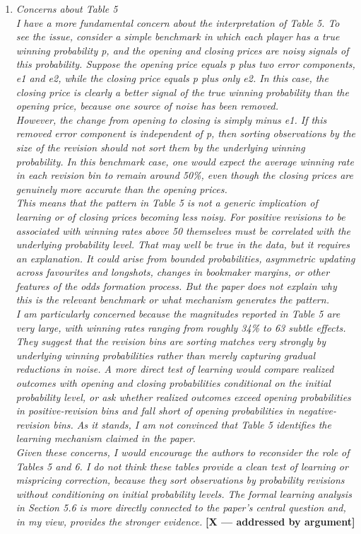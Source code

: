 \documentclass[letterpaper,12pt]{article}
\newcounter{b}
\newcommand{\argX}{\textcolor{green!55!black}{\textbf{[X --- addressed by argument]}}}
\begin{document}
\begin{enumerate}
\item \textit{Concerns about Table 5\\[6pt]
I have a more fundamental concern about the interpretation of Table 5. To see the issue,
consider a simple benchmark in which each player has a true winning probability p, and
the opening and closing prices are noisy signals of this probability. Suppose the opening
price equals p plus two error components, e1 and e2, while the closing price equals p
plus only e2. In this case, the closing price is clearly a better signal of the true winning probability than the opening price, because one source of noise has been removed.\\[6pt]
However, the change from opening to closing is simply minus e1. If this removed error
component is independent of p, then sorting observations by the size of the revision
should not sort them by the underlying winning probability. In this benchmark case, one
would expect the average winning rate in each revision bin to remain around 50\%, even
though the closing prices are genuinely more accurate than the opening prices.\\[6pt]
This means that the pattern in Table 5 is not a generic implication of learning or of closing
prices becoming less noisy. For positive revisions to be associated with winning rates
above 50%
themselves must be correlated with the underlying probability level. That may well be
true in the data, but it requires an explanation. It could arise from bounded probabilities, asymmetric updating across favourites and longshots, changes in bookmaker margins,
or other features of the odds formation process. But the paper does not explain why this
is the relevant benchmark or what mechanism generates the pattern.\\[6pt]
I am particularly concerned because the magnitudes reported in Table 5 are very large,
with winning rates ranging from roughly 34\% to 63%
subtle effects. They suggest that the revision bins are sorting matches very strongly by
underlying winning probabilities rather than merely capturing gradual reductions in noise.
A more direct test of learning would compare realized outcomes with opening and closing
probabilities conditional on the initial probability level, or ask whether realized outcomes
exceed opening probabilities in positive-revision bins and fall short of opening
probabilities in negative-revision bins. As it stands, I am not convinced that Table 5
identifies the learning mechanism claimed in the paper.\\[6pt]
Given these concerns, I would encourage the authors to reconsider the role of Tables 5
and 6. I do not think these tables provide a clean test of learning or mispricing correction,
because they sort observations by probability revisions without conditioning on initial
probability levels. The formal learning analysis in Section 5.6 is more directly connected
to the paper’s central question and, in my view, provides the stronger evidence.} \argX


\end{enumerate}
\end{document}
